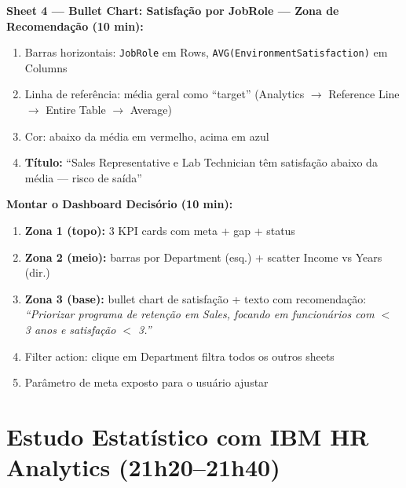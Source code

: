 \begin{SolvedBox}
\textbf{Sheet 4 — Bullet Chart: Satisfação por JobRole — Zona de Recomendação (10 min):}
\begin{enumerate}
  \item Barras horizontais: \texttt{JobRole} em Rows,
  \texttt{AVG(EnvironmentSatisfaction)} em Columns
  \item Linha de referência: média geral como ``target''
  (Analytics $\to$ Reference Line $\to$ Entire Table $\to$ Average)
  \item Cor: abaixo da média em vermelho, acima em azul
  \item \textbf{Título:} ``Sales Representative e Lab Technician
  têm satisfação abaixo da média — risco de saída''
\end{enumerate}

\textbf{Montar o Dashboard Decisório (10 min):}
\begin{enumerate}
  \item \textbf{Zona 1 (topo):} 3 KPI cards com meta + gap + status
  \item \textbf{Zona 2 (meio):} barras por Department (esq.) +
  scatter Income vs Years (dir.)
  \item \textbf{Zona 3 (base):} bullet chart de satisfação +
  texto com recomendação:
  \textit{``Priorizar programa de retenção em Sales, focando em
  funcionários com $<$ 3 anos e satisfação $<$ 3.''}
  \item Filter action: clique em Department filtra todos os outros sheets
  \item Parâmetro de meta exposto para o usuário ajustar
\end{enumerate}
\end{SolvedBox}

\section{Estudo Estatístico com IBM HR Analytics (21h20–21h40)}

